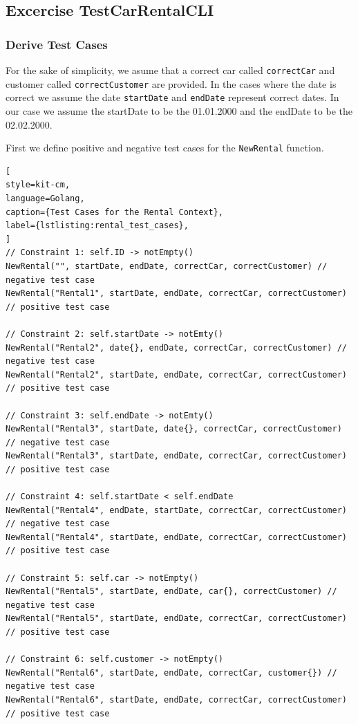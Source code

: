 \subsection{Excercise TestCarRentalCLI}
\label{sec:exercise_test_car_rental_cli}

\subsubsection*{Derive Test Cases}
For the sake of simplicity, we asume that a correct car called \texttt{correctCar} and customer called \texttt{correctCustomer} are provided.
In the cases where the date is correct we assume the date \texttt{startDate} and \texttt{endDate} represent correct dates.
In our case we assume the startDate to be the 01.01.2000 and the endDate to be the 02.02.2000.

First we define positive and negative test cases for the \texttt{NewRental} function.
\begin{lstlisting}[
style=kit-cm,
language=Golang,
caption={Test Cases for the Rental Context},
label={lstlisting:rental_test_cases},
]
// Constraint 1: self.ID -> notEmpty()
NewRental("", startDate, endDate, correctCar, correctCustomer) // negative test case
NewRental("Rental1", startDate, endDate, correctCar, correctCustomer) // positive test case

// Constraint 2: self.startDate -> notEmty()
NewRental("Rental2", date{}, endDate, correctCar, correctCustomer) // negative test case
NewRental("Rental2", startDate, endDate, correctCar, correctCustomer) // positive test case

// Constraint 3: self.endDate -> notEmty()
NewRental("Rental3", startDate, date{}, correctCar, correctCustomer) // negative test case
NewRental("Rental3", startDate, endDate, correctCar, correctCustomer) // positive test case

// Constraint 4: self.startDate < self.endDate
NewRental("Rental4", endDate, startDate, correctCar, correctCustomer) // negative test case
NewRental("Rental4", startDate, endDate, correctCar, correctCustomer) // positive test case

// Constraint 5: self.car -> notEmpty()
NewRental("Rental5", startDate, endDate, car{}, correctCustomer) // negative test case
NewRental("Rental5", startDate, endDate, correctCar, correctCustomer) // positive test case

// Constraint 6: self.customer -> notEmpty()
NewRental("Rental6", startDate, endDate, correctCar, customer{}) // negative test case
NewRental("Rental6", startDate, endDate, correctCar, correctCustomer) // positive test case
\end{lstlisting}
  
